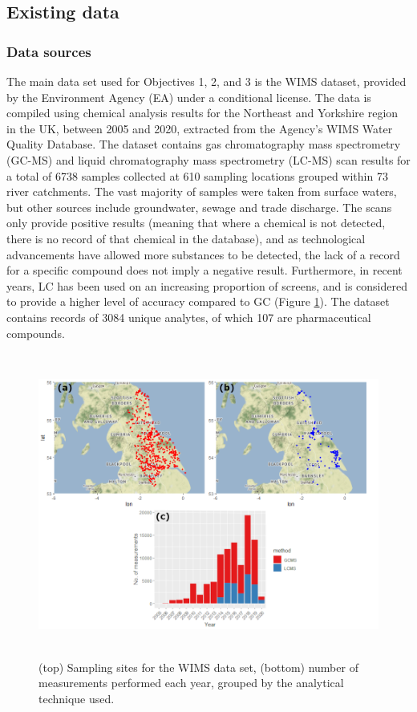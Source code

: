 \documentclass{article}
\begin{document}
\subsection{Existing data}
\subsubsection{Data sources}
The main data set used for Objectives 1, 2, and 3 is the WIMS dataset, provided by the Environment Agency (EA) under a conditional license. The data is compiled using chemical analysis results for the Northeast and Yorkshire region in the UK, between 2005 and 2020, extracted from the Agency’s WIMS Water Quality Database. The dataset contains gas chromatography mass spectrometry (GC-MS) and liquid chromatography mass spectrometry (LC-MS) scan results for a total of 6738 samples collected at 610 sampling locations grouped within 73 river catchments. The vast majority of samples were taken from surface waters, but other sources include groundwater, sewage and trade discharge. The scans only provide positive results (meaning that where a chemical is not detected, there is no record of that chemical in the database), and as technological advancements have allowed more substances to be detected, the lack of a record for a specific compound does not imply a negative result. Furthermore, in recent years, LC has been used on an increasing proportion of screens, and is considered to provide a higher level of accuracy compared to GC (Figure \ref{fig_hist_and_maps}). The dataset contains records of 3084 unique analytes, of which 107 are pharmaceutical compounds.

\begin{figure}
    \centering
    \includegraphics[height=10cm]{fig_WIMS_by_method.png}
    \caption{(top) Sampling sites for the WIMS data set, (bottom) number of measurements performed each year, grouped by the analytical technique used.}
    \label{fig_hist_and_maps}
\end{figure}
\end{document}
